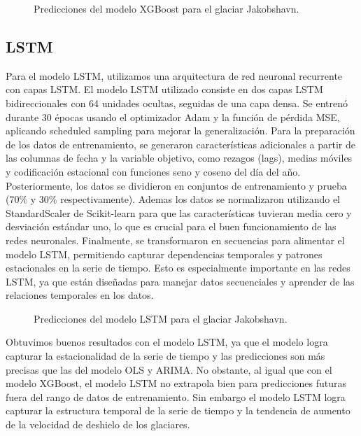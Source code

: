 \documentclass[sigconf,authordraft,language=spanish]{acmart}
\begin{document}
\begin{figure}[htbp]
   \centering
   
    \caption{Predicciones del modelo XGBoost para el glaciar Jakobshavn.}
    \label{fig:jakobshavn_xgb}
\end{figure}


\subsection{LSTM}

Para el modelo LSTM, utilizamos una arquitectura de red neuronal recurrente con capas LSTM.
El modelo LSTM utilizado consiste en dos capas LSTM bidireccionales con 64 unidades ocultas, seguidas de una capa densa. Se entrenó durante 30 épocas usando el optimizador Adam y la función de pérdida MSE, aplicando scheduled sampling para mejorar la generalización.
Para la preparación de los datos de entrenamiento, se generaron características adicionales a partir de las columnas de fecha y la variable objetivo, como rezagos (lags), medias móviles y codificación estacional con funciones seno y coseno del día del año. Posteriormente, los datos se dividieron en conjuntos de entrenamiento y prueba (70\% y 30\% respectivamente). 
Ademas los datos se normalizaron utilizando el StandardScaler de Scikit-learn para que las características tuvieran media cero y desviación estándar uno, lo que es crucial para el buen funcionamiento de las redes neuronales.
Finalmente, se transformaron en secuencias para alimentar el modelo LSTM, permitiendo capturar dependencias temporales y patrones estacionales en la serie de tiempo. 
Esto es especialmente importante en las redes LSTM, ya que están diseñadas para manejar datos secuenciales y aprender de las relaciones temporales en los datos.


\begin{figure}[htbp]
   \centering
   
    \caption{Predicciones del modelo LSTM para el glaciar Jakobshavn.}
    \label{fig:jakobshavn_lstm}
\end{figure}

Obtuvimos buenos resultados con el modelo LSTM, ya que el modelo logra capturar la estacionalidad de la serie de tiempo y las predicciones son más precisas que las del modelo OLS y ARIMA.
No obstante, al igual que con el modelo XGBoost, el modelo LSTM no extrapola bien para predicciones futuras fuera del rango de datos de entrenamiento. 
Sin embargo el modelo LSTM logra capturar la estructura temporal de la serie de tiempo y la tendencia de aumento 
de la velocidad de deshielo de los glaciares.
\end{document}
